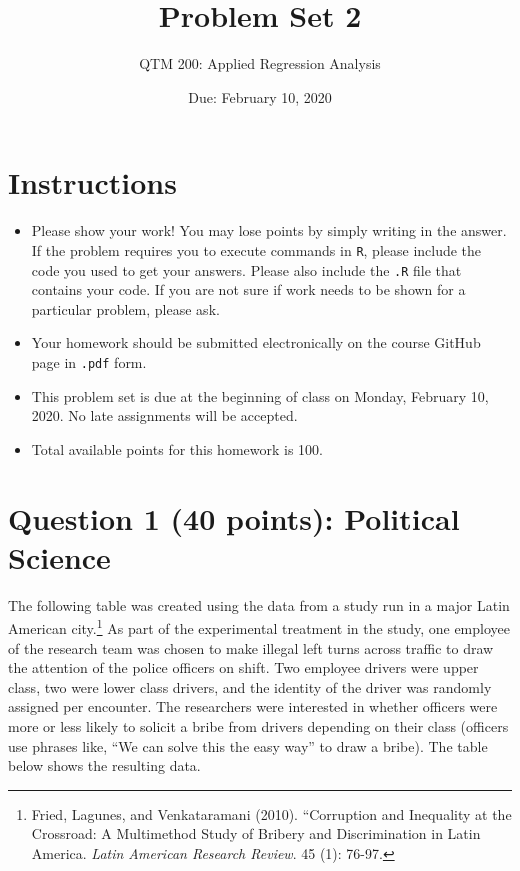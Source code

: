 \documentclass[12pt,letterpaper]{article}
\title{Problem Set 2}
\date{Due: February 10, 2020}
\author{QTM 200: Applied Regression Analysis}
\begin{document}
	\maketitle
	
	\section*{Instructions}
	\begin{itemize}
		\item Please show your work! You may lose points by simply writing in the answer. If the problem requires you to execute commands in \texttt{R}, please include the code you used to get your answers. Please also include the \texttt{.R} file that contains your code. If you are not sure if work needs to be shown for a particular problem, please ask.
		\item Your homework should be submitted electronically on the course GitHub page in \texttt{.pdf} form.
		\item This problem set is due at the beginning of class on Monday, February 10, 2020. No late assignments will be accepted.
		\item Total available points for this homework is 100.
	\end{itemize}
	
	\vspace{.5cm}
	\section*{Question 1 (40 points): Political Science}
		\vspace{.25cm}
	The following table was created using the data from a study run in a major Latin American city.\footnote{Fried, Lagunes, and Venkataramani (2010). ``Corruption and Inequality at the Crossroad: A Multimethod Study of Bribery and Discrimination in Latin America. \textit{Latin American Research Review}. 45 (1): 76-97.} As part of the experimental treatment in the study, one employee of the research team was chosen to make illegal left turns across traffic to draw the attention of the police officers on shift. Two employee drivers were upper class, two were lower class drivers, and the identity of the driver was randomly assigned per encounter. The researchers were interested in whether officers were more or less likely to solicit a bribe from drivers depending on their class (officers use phrases like, ``We can solve this the easy way'' to draw a bribe). The table below shows the resulting data.
\end{document}
